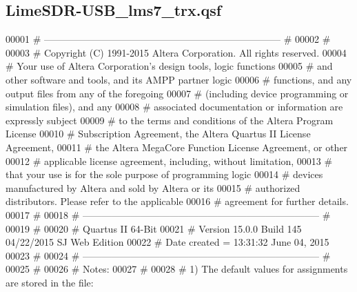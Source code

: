 \subsection{Lime\+S\+D\+R-\/\+U\+S\+B\+\_\+lms7\+\_\+trx.qsf}
\label{LimeSDR-USB__lms7__trx_8qsf_source}

\begin{DoxyCode}
00001 \textcolor{keyword}{# -------------------------------------------------------------------------- #}
00002 \textcolor{keyword}{#}
00003 \textcolor{keyword}{# Copyright (C) 1991-2015 Altera Corporation. All rights reserved.}
00004 \textcolor{keyword}{# Your use of Altera Corporation's design tools, logic functions}
00005 \textcolor{keyword}{# and other software and tools, and its AMPP partner logic}
00006 \textcolor{keyword}{# functions, and any output files from any of the foregoing}
00007 \textcolor{keyword}{# (including device programming or simulation files), and any}
00008 \textcolor{keyword}{# associated documentation or information are expressly subject}
00009 \textcolor{keyword}{# to the terms and conditions of the Altera Program License}
00010 \textcolor{keyword}{# Subscription Agreement, the Altera Quartus II License Agreement,}
00011 \textcolor{keyword}{# the Altera MegaCore Function License Agreement, or other}
00012 \textcolor{keyword}{# applicable license agreement, including, without limitation,}
00013 \textcolor{keyword}{# that your use is for the sole purpose of programming logic}
00014 \textcolor{keyword}{# devices manufactured by Altera and sold by Altera or its}
00015 \textcolor{keyword}{# authorized distributors.  Please refer to the applicable}
00016 \textcolor{keyword}{# agreement for further details.}
00017 \textcolor{keyword}{#}
00018 \textcolor{keyword}{# -------------------------------------------------------------------------- #}
00019 \textcolor{keyword}{#}
00020 \textcolor{keyword}{# Quartus II 64-Bit}
00021 \textcolor{keyword}{# Version 15.0.0 Build 145 04/22/2015 SJ Web Edition}
00022 \textcolor{keyword}{# Date created = 13:31:32  June 04, 2015}
00023 \textcolor{keyword}{#}
00024 \textcolor{keyword}{# -------------------------------------------------------------------------- #}
00025 \textcolor{keyword}{#}
00026 \textcolor{keyword}{# Notes:}
00027 \textcolor{keyword}{#}
00028 \textcolor{keyword}{# 1) The default values for assignments are stored in the file:}

\end{DoxyCode}
